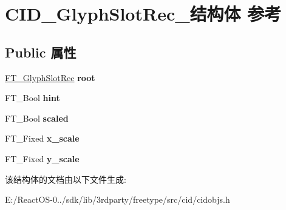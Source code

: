 \hypertarget{struct_c_i_d___glyph_slot_rec__}{}\section{C\+I\+D\+\_\+\+Glyph\+Slot\+Rec\+\_\+结构体 参考}
\label{struct_c_i_d___glyph_slot_rec__}
\subsection*{Public 属性}
\begin{DoxyCompactItemize}
\item 
\mbox{\label{struct_c_i_d___glyph_slot_rec___ae4925cb531f6110d5a2b9003b8b823b8}} 
\hyperlink{struct_f_t___glyph_slot_rec__}{F\+T\+\_\+\+Glyph\+Slot\+Rec} {\bfseries root}
\item 
\mbox{\label{struct_c_i_d___glyph_slot_rec___a181e1e10b1e4c190fe48ab268b644938}} 
F\+T\+\_\+\+Bool {\bfseries hint}
\item 
\mbox{\label{struct_c_i_d___glyph_slot_rec___abcfc4017a999cb47c3a7539b5c71c784}} 
F\+T\+\_\+\+Bool {\bfseries scaled}
\item 
\mbox{\label{struct_c_i_d___glyph_slot_rec___a108cd3d4a0f50b3ee6ea049f8ad0e55c}} 
F\+T\+\_\+\+Fixed {\bfseries x\+\_\+scale}
\item 
\mbox{\label{struct_c_i_d___glyph_slot_rec___a979657334d0c710434e86d89e6d9ffcd}} 
F\+T\+\_\+\+Fixed {\bfseries y\+\_\+scale}
\end{DoxyCompactItemize}


该结构体的文档由以下文件生成\+:\begin{DoxyCompactItemize}
\item 
E\+:/\+React\+O\+S-\/0../sdk/lib/3rdparty/freetype/src/cid/cidobjs.\+h\end{DoxyCompactItemize}
